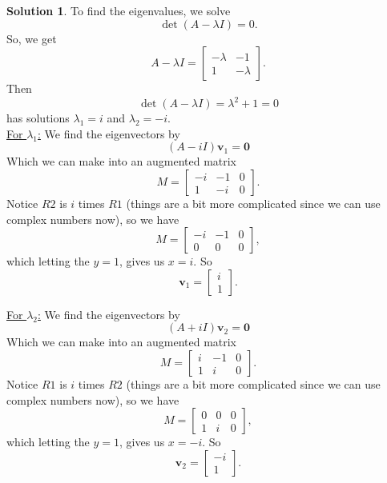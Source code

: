 \documentclass[12pt]{report} %
\theoremstyle{definition}
\newtheorem{solution}{Solution}
\begin{document}
\begin{solution}
To find the eigenvalues, we solve
\[
\det(A-\lambda I) = 0.
\]
So, we get
\[
A-\lambda I = \begin{bmatrix} -\lambda & -1 \\ 1 & -\lambda \end{bmatrix}.
\]
Then 
\[
\det(A-\lambda I) = \lambda^2 + 1 = 0
\]
has solutions $\lambda_1 = i$ and $\lambda_2 = -i$.\\

\noindent \underline{For $\lambda_1$:}
We find the eigenvectors by
\[
(A-iI)\mathbf{v}_1 = \mathbf{0}
\]
Which we can make into an augmented matrix
\[
    M=\left[ \begin{array}{cc|c}
        -i & -1 & 0\\
        1 & -i & 0
    \end{array}\right].
\]
Notice $R2$ is $i$ times $R1$ (things are a bit more complicated since we can use complex numbers now), so we have
\[
    M=\left[ \begin{array}{cc|c}
        -i & -1 & 0\\
        0 & 0 & 0
    \end{array}\right],
\]
which letting the $y=1$, gives us $x=i$. So
\[
\mathbf{v}_1 = \begin{bmatrix} i\\ 1 \end{bmatrix}.
\]

\noindent \underline{For $\lambda_2$:}
We find the eigenvectors by
\[
(A+iI)\mathbf{v}_2 = \mathbf{0}
\]
Which we can make into an augmented matrix
\[
    M=\left[ \begin{array}{cc|c}
        i & -1 & 0\\
        1 & i & 0
    \end{array}\right].
\]
Notice $R1$ is $i$ times $R2$ (things are a bit more complicated since we can use complex numbers now), so we have
\[
    M=\left[ \begin{array}{cc|c}
        0 & 0 & 0\\
        1 & i & 0
    \end{array}\right],
\]
which letting the $y=1$, gives us $x=-i$. So
\[
\mathbf{v}_2 = \begin{bmatrix} -i\\ 1 \end{bmatrix}.
\]
\end{solution}
\end{document}
